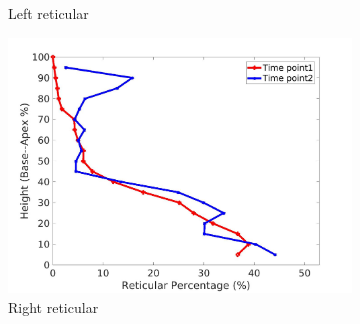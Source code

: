\begin{figure}[H]
\begin{subfigure}{.42\linewidth}
  \caption{Left reticular}
  \label{fig:IPF10DiseaseAgainstHeight-c} 
\end{subfigure} 
\begin{subfigure}{.42\linewidth}%
  \includegraphics[width=\linewidth,trim={{.0\wd0} {.0\wd0} {.0\wd0} {.0\wd0}},clip]{Appendix/Image_AppexA/BaseToApex/IPF10RightLungReticularDiseaseAgainstHeight.jpg}
  \caption{Right reticular}
  \label{fig:IPF10DiseaseAgainstHeight-d}
\end{subfigure}
\begin{subfigure}{.42\linewidth}%

\end{subfigure}
\end{figure}
